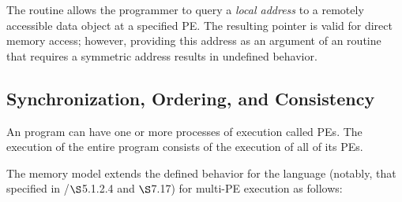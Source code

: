 The  routine allows the programmer to query a {\em local
address} to a remotely accessible data object at a specified \ac{PE}.  The
resulting pointer is valid for direct memory access; however, providing this
address as an argument of an \openshmem routine that requires a symmetric
address results in undefined behavior.

\subsection{Synchronization, Ordering, and Consistency}

An \openshmem program can have one or more processes of execution
called \acp{PE}.  The execution of the entire \openshmem program
consists of the execution of all of its \acp{PE}.

The \openshmem memory model extends the defined behavior for the \Cstd
language (notably, that specified in \Cstd[11]/\Cstd[17] $\S$5.1.2.4
and $\S$7.17) for multi-\ac{PE} execution as follows:

